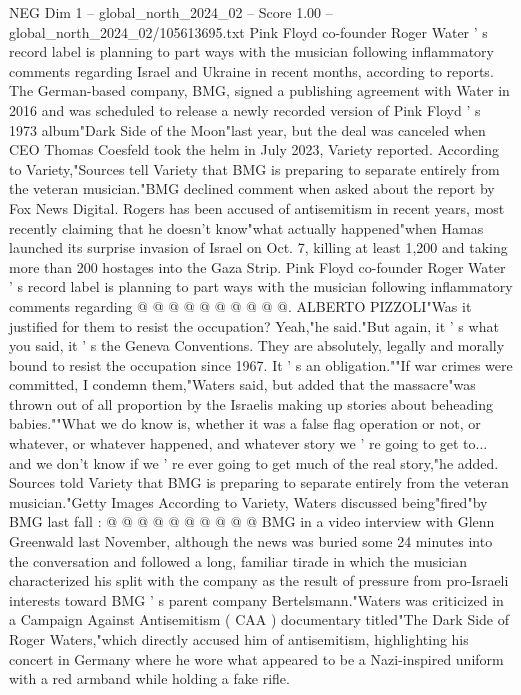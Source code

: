 \begin{textsample}{NEG Dim 1 – global\_north\_2024\_02 – Score 1.00 – global\_north\_2024\_02/105613695.txt}  \label{ex:f1_neg_183}
Pink Floyd co-founder Roger Water ' s record label is planning to part ways with the musician following inflammatory comments regarding Israel and Ukraine in recent months, according to reports.
The German-based company, BMG, signed a publishing agreement with Water in 2016 and was scheduled to release a newly recorded version of Pink Floyd ' s 1973 album"Dark Side of the Moon"last year, but the deal was canceled when CEO Thomas Coesfeld took the helm in July 2023, Variety reported.
According to Variety,"Sources tell Variety that BMG is preparing to separate entirely from the veteran musician."BMG declined comment when asked about the report by Fox News Digital.
Rogers has been accused of antisemitism in recent years, most recently claiming that he doesn't know"what actually happened"when Hamas launched its surprise invasion of Israel on Oct. 7, killing at least 1,200 and taking more than 200 hostages into the Gaza Strip.
Pink Floyd co-founder Roger Water ' s record label is planning to part ways with the musician following inflammatory comments regarding @ @ @ @ @ @ @ @ @ @.
ALBERTO PIZZOLI"Was it justified for them to resist the occupation?
Yeah,"he said."But again, it ' s what you said, it ' s the Geneva Conventions.
They are absolutely, legally and morally bound to resist the occupation since 1967.
It ' s an obligation.""If war crimes were committed, I condemn them,"Waters said, but added that the massacre"was thrown out of all proportion by the Israelis making up stories about beheading babies.""What we do know is, whether it was a false flag operation or not, or whatever, or whatever happened, and whatever story we ' re going to get to... and we don't know if we ' re ever going to get much of the real story,"he added.
Sources told Variety that BMG is preparing to separate entirely from the veteran musician."Getty Images According to Variety, Waters discussed being"fired"by BMG last fall : @ @ @ @ @ @ @ @ @ @ BMG in a video interview with Glenn Greenwald last November, although the news was buried some 24 minutes into the conversation and followed a long, familiar tirade in which the musician characterized his split with the company as the result of pressure from pro-Israeli interests toward BMG ' s parent company Bertelsmann."Waters was criticized in a Campaign Against Antisemitism ( CAA ) documentary titled"The Dark Side of Roger Waters,"which directly accused him of antisemitism, highlighting his concert in Germany where he wore what appeared to be a Nazi-inspired uniform with a red armband while holding a fake rifle.

\end{textsample}
